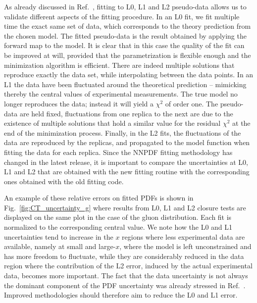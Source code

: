 As already discussed in Ref.~\cite{nnpdf30}, fitting to L0, L1 and L2
pseudo-data allows us to validate different aspects of the fitting procedure. In
an L0 fit, we fit multiple time the exact same set of data, which corresponds to
the theory prediction from the chosen model. The fitted pseudo-data is the
result obtained by applying the forward map to the model. It is clear that in
this case the quality of the fit can be improved at will, provided that the
parametrization is flexible enough and the minimization algorithm is efficient.
There are indeed multiple solutions that reproduce exactly the data set, while
interpolating between the data points. In an L1 the data have been fluctuated
around the theoretical prediction -- mimicking thereby the central values of
experimental measurements. The true model no longer reproduces the data; instead
it will yield a $\chi^2$ of order one. The pseudo-data are held fixed,
fluctuations from one replica to the next are due to the existence of multiple
solutions that hold a similar value for the residual $\chi^2$ at the end of the
minimization process. Finally, in the L2 fits, the fluctuations of the data are
reproduced by the replicas, and propagated to the model function when fitting
the data for each replica. Since the NNPDF fitting methodology has changed in
the latest release, it is important to compare the uncertainties at L0, L1 and
L2 that are obtained with the new fitting routine with the corresponding
ones obtained with the old fitting code. 

An example of these relative errors on fitted PDFs is shown in Fig.~\ref{fig:CT_uncertainty_g} 
where results from L0, L1 and L2 closure tests are displayed on the same plot in the case of the gluon distribution.
Each fit is normalized to the corresponding central value. 
We note how the L0 and L1 uncertainties tend to increase in the $x$ regions where less experimental data are available,
namely at small and large-$x$, where the model is left unconstrained and has more freedom to fluctuate,
while they are considerably reduced in the data region 
where the contribution of the L2 error, induced by the actual experimental data, becomes more important.
The fact that the data uncertainty is not always the dominant component of the PDF uncertainty
was already stressed in Ref.~\cite{nnpdf30}. Improved methodologies should therefore aim to reduce the L0 and L1
error. 

